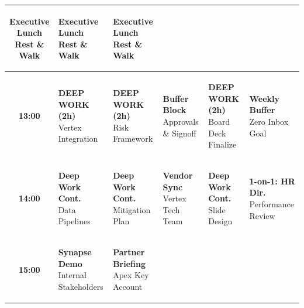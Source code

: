\documentclass[10pt, landscape]{article}
\begin{document}
\begin{minipage}[t]{0.72\linewidth}
\begin{tabularx}{\linewidth}{|c|>{\raggedright\arraybackslash}X|>{\raggedright\arraybackslash}X|>{\raggedright\arraybackslash}X|>{\raggedright\arraybackslash}X|>{\raggedright\arraybackslash}X|}
    \colorbox{PersonalBg}{\parbox[t]{0.92\linewidth}{\tiny\color{PersonalTxt}\textbf{Executive Lunch}\\Rest \& Walk}} &
    \colorbox{PersonalBg}{\parbox[t]{0.92\linewidth}{\tiny\color{PersonalTxt}\textbf{Executive Lunch}\\Rest \& Walk}} &
    \colorbox{PersonalBg}{\parbox[t]{0.92\linewidth}{\tiny\color{PersonalTxt}\textbf{Executive Lunch}\\Rest \& Walk}} \\
    \hline
    \textbf{13:00} &
    \colorbox{DeepWorkBg}{\parbox[t]{0.92\linewidth}{\tiny\color{DeepWorkTxt}\textbf{DEEP WORK (2h)}\\Vertex Integration}} &
    \colorbox{DeepWorkBg}{\parbox[t]{0.92\linewidth}{\tiny\color{DeepWorkTxt}\textbf{DEEP WORK (2h)}\\Risk Framework}} &
    \colorbox{AdminBg}{\parbox[t]{0.92\linewidth}{\tiny\color{AdminTxt}\textbf{Buffer Block}\\Approvals \& Signoff}} &
    \colorbox{DeepWorkBg}{\parbox[t]{0.92\linewidth}{\tiny\color{DeepWorkTxt}\textbf{DEEP WORK (2h)}\\Board Deck Finalize}} &
    \colorbox{AdminBg}{\parbox[t]{0.92\linewidth}{\tiny\color{AdminTxt}\textbf{Weekly Buffer}\\Zero Inbox Goal}} \\
    \hline
    \textbf{14:00} &
    \colorbox{DeepWorkBg}{\parbox[t]{0.92\linewidth}{\tiny\color{DeepWorkTxt}\textbf{Deep Work Cont.}\\Data Pipelines}} &
    \colorbox{DeepWorkBg}{\parbox[t]{0.92\linewidth}{\tiny\color{DeepWorkTxt}\textbf{Deep Work Cont.}\\Mitigation Plan}} &
    \colorbox{MeetingBg}{\parbox[t]{0.92\linewidth}{\tiny\color{MeetingTxt}\textbf{Vendor Sync}\\Vertex Tech Team}} &
    \colorbox{DeepWorkBg}{\parbox[t]{0.92\linewidth}{\tiny\color{DeepWorkTxt}\textbf{Deep Work Cont.}\\Slide Design}} &
    \colorbox{MeetingBg}{\parbox[t]{0.92\linewidth}{\tiny\color{MeetingTxt}\textbf{1-on-1: HR Dir.}\\Performance Review}} \\
    \hline
    \textbf{15:00} &
    \colorbox{MeetingBg}{\parbox[t]{0.92\linewidth}{\tiny\color{MeetingTxt}\textbf{Synapse Demo}\\Internal Stakeholders}} &
    \colorbox{ClientBg}{\parbox[t]{0.92\linewidth}{\tiny\color{ClientTxt}\textbf{Partner Briefing}\\Apex Key Account}} &

\end{tabularx}
\end{minipage}
\end{document}
